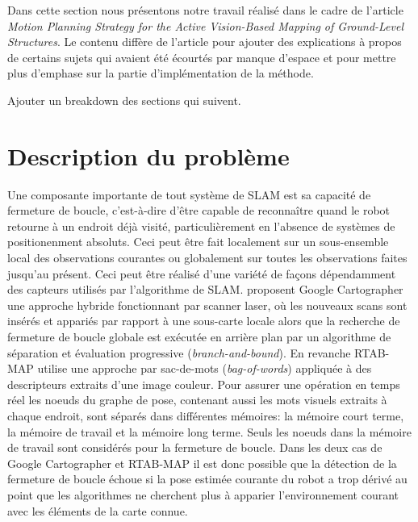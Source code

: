 \label{sec:ugv}

Dans cette section nous présentons notre travail réalisé dans le cadre de l'article \textit{Motion Planning Strategy for the Active Vision-Based Mapping of Ground-Level Structures}. Le contenu diffère de l'article pour ajouter des explications à propos de certains sujets qui avaient été écourtés par manque d'espace et pour mettre plus d'emphase sur la partie d'implémentation de la méthode.

\color{red}
Ajouter un breakdown des sections qui suivent.
\color{black}

\section{Description du problème} \label{sec:ugv_problem_description}
Une composante importante de tout système de SLAM est sa capacité de fermeture de boucle, c'est-à-dire d'être capable de reconnaître quand le robot retourne à un endroit déjà visité, particulièrement en l'absence de systèmes de positionenment absoluts. Ceci peut être fait localement sur un sous-ensemble local des observations courantes ou globalement sur toutes les observations faites jusqu'au présent. Ceci peut être réalisé d'une variété de façons dépendamment des capteurs utilisés par l'algorithme de SLAM. \citep{Hess2016} proposent Google Cartographer une approche hybride fonctionnant par scanner laser, où les nouveaux scans sont insérés et appariés par rapport à une sous-carte locale alors que la recherche de fermeture de boucle globale est exécutée en arrière plan par un algorithme de séparation et évaluation progressive (\textit{branch-and-bound}). En revanche RTAB-MAP \citep{Labbe2014} utilise une approche par sac-de-mots (\textit{bag-of-words}) appliquée à des descripteurs extraits d'une image couleur. Pour assurer une opération en temps réel les noeuds du graphe de pose, contenant aussi les mots visuels extraits à chaque endroit, sont séparés dans différentes mémoires: la mémoire court terme, la mémoire de travail et la mémoire long terme. Seuls les noeuds dans la mémoire de travail sont considérés pour la fermeture de boucle. Dans les deux cas de Google Cartographer et RTAB-MAP il est donc possible que la détection de la fermeture de boucle échoue si la pose estimée courante du robot a trop dérivé au point que les algorithmes ne cherchent plus à apparier l'environnement courant avec les éléments de la carte connue.

